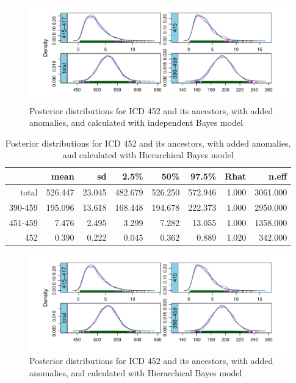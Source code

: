\begin{figure}[!h]
	\centering
	\includegraphics[width=1\linewidth]{../../R-codes/JAGS/plots/mimic/Density415h}
	\caption{Posterior distributions for ICD 452 and its ancestors, with added anomalies, and calculated with independent Bayes model}
	\label{fig:density452}
\end{figure}

\newpage%

\begin{table}[!t]
	\centering
	\begin{tabular}{rrrrrrrr}
		\hline
		& mean & sd & 2.5\% & 50\% & 97.5\% & Rhat & n.eff \\ 
		\hline
		total & 526.447 & 23.045 & 482.679 & 526.250 & 572.946 & 1.000 & 3061.000 \\ 
		390-459 & 195.096 & 13.618 & 168.448 & 194.678 & 222.373 & 1.000 & 2950.000 \\ 
		451-459 & 7.476 & 2.495 & 3.299 & 7.282 & 13.055 & 1.000 & 1358.000 \\ 
		452 & 0.390 & 0.222 & 0.045 & 0.362 & 0.889 & 1.020 & 342.000 \\ 
		\hline
	\end{tabular}
	\caption{Posterior distributions for ICD 452 and its ancestors, with added anomalies, and calculated with Hierarchical Bayes model} 
	\label{tab:postsum452h.mimic}
\end{table}

\begin{figure}[!h]
	\centering
	\includegraphics[width=1\linewidth]{../../R-codes/JAGS/plots/mimic/Density415h}
	\caption{Posterior distributions for ICD 452 and its ancestors, with added anomalies, and calculated with Hierarchical Bayes model}
	\label{fig:density452h}
\end{figure}

